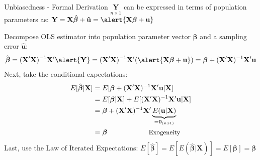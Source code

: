\documentclass[11pt, aspectratio = 169]{beamer}
\begin{document}
\begin{frame}{Unbiasedness - Formal Derivation}
$\underset{n \times 1}{\mathbf{Y}}$ can be expressed in terms of \alert{population parameters} as:
$
\mathbf{Y} = \mathbf{X}\boldsymbol{\hat{\beta}} + \mathbf{\hat{u}} = \alert{\mathbf{X}\boldsymbol{\beta} + \mathbf{u}}
$

\pause
Decompose OLS estimator into population parameter vector $\boldsymbol{\beta}$ and a sampling error $\mathbf{\hat{u}}$:
\begin{align*}
\hat{\boldsymbol{\beta}}=(\mathbf{X}'\mathbf{X})^{-1}\mathbf{X}'\alert{\mathbf{Y}}
                    = (\mathbf{X}'\mathbf{X})^{-1}\mathbf{X}'(\alert{\mathbf{X}\boldsymbol{\beta}+\mathbf{u}}) = \boldsymbol{\beta}+(\mathbf{X}'\mathbf{X})^{-1}\mathbf{X}'\mathbf{u}
\end{align*}
\pause
Next, take the conditional expectations:
\begin{align*}
E[\hat{\boldsymbol{\beta}}|\mathbf{X}]&= E[\boldsymbol{\beta}+(\mathbf{X}'\mathbf{X})^{-1}\mathbf{X}'\mathbf{u}|\mathbf{X}]\\
                            &=  E[\boldsymbol{\beta}|\mathbf{X}] + E[(\mathbf{X}'\mathbf{X})^{-1}\mathbf{X}'\mathbf{u}|\mathbf{X}]\\
                            &=  \boldsymbol{\beta}+(\mathbf{X}'\mathbf{X})^{-1}\mathbf{X}'\underbrace{E(\mathbf{u}|\mathbf{X})}_{=\mathbf{0}_{(nx1)}} \\
                            &=\boldsymbol{\beta} \: \hspace{+1.992cm} \text{\small Exogeneity}
\end{align*}
\pause
Last, use the Law of Iterated Expectations:
$E[\hat{\boldsymbol{\beta}}]=  E[E(\hat{\boldsymbol{\beta}}|\mathbf{X})  ]                           =E[\boldsymbol{\beta}] 
                            = \boldsymbol{\beta}$
\end{frame}
\end{document}
